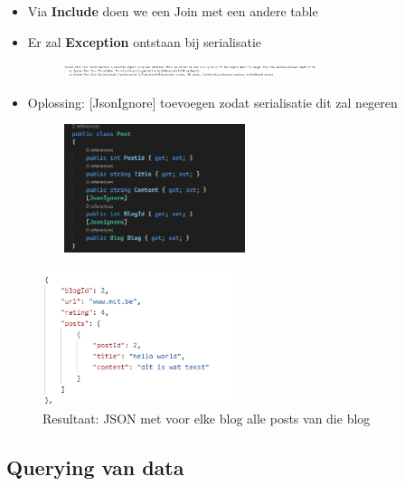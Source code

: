 \documentclass{article}
\begin{document}
\begin{itemize}
    \item Via \textbf{Include} doen we een Join met een andere table
    \item Er zal \textbf{Exception} ontstaan bij serialisatie
    \begin{figure}[H]
        \centering
        \includegraphics[width=0.7\textwidth]{efcore-select-related2.png}
        \caption{}
    \end{figure}
    
    \item Oplossing: [JsonIgnore] toevoegen zodat serialisatie dit zal negeren
    \begin{figure}[H]
        \centering
        \includegraphics[width=0.5\textwidth]{efcore-select-related-jsonignore.png}
        \caption{}
    \end{figure}
\end{itemize}

\begin{figure}[H]
    \centering
    \includegraphics[width=0.5\textwidth]{efcore-select-related-result.png}
    \caption{Resultaat: JSON met voor elke blog alle posts van die blog}
\end{figure}


\subsection{Querying van data}
\end{document}
